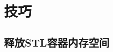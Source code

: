 \chapter{技巧}
\section{释放STL容器内存空间}
\inputminted{cpp}{\source/tricks/truly-release-container-space.cpp}

